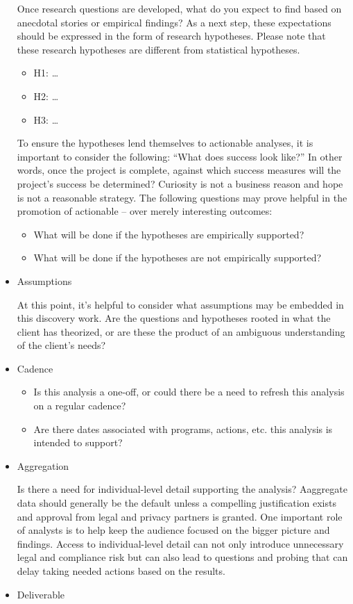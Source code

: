 \documentclass[]{book}
\providecommand{\tightlist}{%
  \setlength{\itemsep}{0pt}\setlength{\parskip}{0pt}}
\begin{document}
\begin{itemize}
  Once research questions are developed, what do you expect to find based on anecdotal stories or empirical findings? As a next step, these expectations should be expressed in the form of research hypotheses. Please note that these research hypotheses are different from statistical hypotheses.

  \begin{itemize}
  \tightlist
  \item
    H1: \ldots{}
  \item
    H2: \ldots{}
  \item
    H3: \ldots{}
  \end{itemize}

  To ensure the hypotheses lend themselves to actionable analyses, it is important to consider the following: ``What does success look like?'' In other words, once the project is complete, against which success measures will the project's success be determined? Curiosity is not a business reason and hope is not a reasonable strategy. The following questions may prove helpful in the promotion of actionable -- over merely interesting outcomes:

  \begin{itemize}
  \tightlist
  \item
    What will be done if the hypotheses are empirically supported?
  \item
    What will be done if the hypotheses are not empirically supported?
  \end{itemize}
\item
  Assumptions

  At this point, it's helpful to consider what assumptions may be embedded in this discovery work. Are the questions and hypotheses rooted in what the client has theorized, or are these the product of an ambiguous understanding of the client's needs?
\item
  Cadence

  \begin{itemize}
  \tightlist
  \item
    Is this analysis a one-off, or could there be a need to refresh this analysis on a regular cadence?
  \item
    Are there dates associated with programs, actions, etc. this analysis is intended to support?
  \end{itemize}
\item
  Aggregation

  Is there a need for individual-level detail supporting the analysis? Aaggregate data should generally be the default unless a compelling justification exists and approval from legal and privacy partners is granted. One important role of analysts is to help keep the audience focused on the bigger picture and findings. Access to individual-level detail can not only introduce unnecessary legal and compliance risk but can also lead to questions and probing that can delay taking needed actions based on the results.
\item
  Deliverable


\end{itemize}
\end{document}

